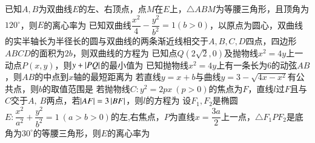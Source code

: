 \documentclass{BHCexam}
\begin{document}
\begin{questions}
\qs 已知$ A,B $为双曲线$ E $的左、右顶点，点$ M $在$ E $上，$ \triangle ABM$为等腰三角形，且顶角为$ 120^{\circ} $，则$ E $的离心率为\xx
{}
\qs 已知双曲线$ \dfrac{x^2}{4}-\dfrac{y^2}{b^2}=1(b>0) $，以原点为圆心，双曲线的实半轴长为半径长的圆与双曲线的两条渐近线相交于$ A,B,C,D $四点，四边形$ ABCD $的面积为$ 2b $，则双曲线的方程为\xx
{}
\qs 已知点$ Q\left(2\sqrt{2},0\right) $及抛物线$ x^2=4y $上一动点$ P\left(x,y\right) $，则$ y+\left| PQ \right| $的最小值为\xx
{}
\qs 已知抛物线$ x^2=4y $上有一条长为$ 6 $的动弦$ AB $，则$ AB $的中点到$x$轴的最短距离为\xx
{} 
\qs 若直线$ y=x+b $与曲线$ y=3-\sqrt{4x-x^2} $有公共点，则$ b $的取值范围是\xx
{}
\qs 若抛物线$ C:y^2=2px~\left(p>0\right) $的焦点为$ F $，直线$ l $过$ F $且与$ C $交于$ A,\ B $两点，若$ \left| AF \right|=3\left| BF \right| $，则$ l $的方程为\xx
{}
\qs 设$ F_1,F_2   $是椭圆$E:\dfrac{x^2}{a^2}+\dfrac{y^2}{b^2}=1~(a>b>0)$的左,右焦点，$ P $为直线$ x=\dfrac{3a}{2} $上一点，$ \triangle F_1PF_2 $是底角为$ 30^{\circ} $的等腰三角形，则$ E $的离心率为\xx
{}



\end{questions}
\end{document}
